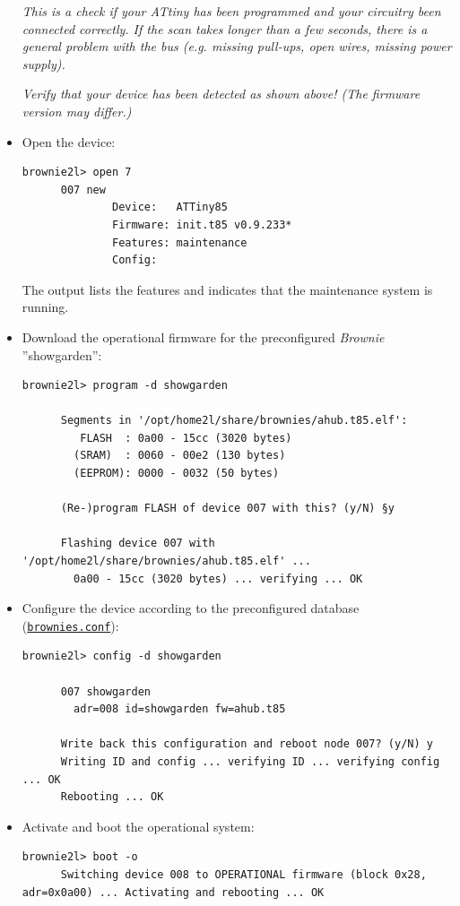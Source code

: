 \documentclass[12pt,english,parskip=half,headheight=19pt]{scrreprt}
\newcommand{\idx}[1]{#1\index{#1}}
\newcommand{\reftool}[1]{\hyperref[tool:#1]{\texttt{\idx{#1}}}}
\begin{document}
\begin{itemize}[$\blacktriangleright$]
    \textit{This is a check if your ATtiny has been programmed and your circuitry been connected
    correctly. If the scan takes longer than a few seconds, there is a general problem with the bus
    (e.g. missing pull-ups, open wires, missing power supply).}

    \textit{Verify that your device has been detected as shown above! (The firmware version may differ.)}

  \item
    Open the device:
    \begin{lstlisting}[language=brownie2l]
      brownie2l> open 7
      007 new
              Device:   ATTiny85
              Firmware: init.t85 v0.9.233*
              Features: maintenance
              Config:
    \end{lstlisting}
    The output lists the features and indicates that the maintenance system is running.

  \item
    Download the operational firmware for the preconfigured \textit{Brownie} ''showgarden'':
    \begin{lstlisting}[language=brownie2l]
      brownie2l> program -d showgarden

      Segments in '/opt/home2l/share/brownies/ahub.t85.elf':
         FLASH  : 0a00 - 15cc (3020 bytes)
        (SRAM)  : 0060 - 00e2 (130 bytes)
        (EEPROM): 0000 - 0032 (50 bytes)

      (Re-)program FLASH of device 007 with this? (y/N) §y

      Flashing device 007 with '/opt/home2l/share/brownies/ahub.t85.elf' ...
        0a00 - 15cc (3020 bytes) ... verifying ... OK
    \end{lstlisting}

  \item
    Configure the device according to the preconfigured database (\reftool{brownies.conf}):
    \begin{lstlisting}[language=brownie2l]
      brownie2l> config -d showgarden

      007 showgarden
        adr=008 id=showgarden fw=ahub.t85

      Write back this configuration and reboot node 007? (y/N) y
      Writing ID and config ... verifying ID ... verifying config ... OK
      Rebooting ... OK
    \end{lstlisting}

  \item
    Activate and boot the operational system:
    \begin{lstlisting}[language=brownie2l]
      brownie2l> boot -o
      Switching device 008 to OPERATIONAL firmware (block 0x28, adr=0x0a00) ... Activating and rebooting ... OK
    \end{lstlisting}


\end{itemize}
\end{document}
